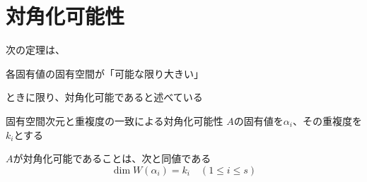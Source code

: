 \documentclass[../../../topic_linear-algebra]{subfiles}
\begin{document}
\sectionline
\section{対角化可能性}

次の定理は、
\begin{shaded}
  各固有値の固有空間が「可能な限り大きい」
\end{shaded}
ときに限り、対角化可能であると述べている

\begin{theorem}{固有空間次元と重複度の一致による対角化可能性}\label{thm:diagonalizable-iff-eigenspace-dim-equals-multiplicity}
  $A$の固有値を$\alpha_i$、その重複度を$k_i$とする

  $A$が対角化可能であることは、次と同値である
  \begin{equation*}
    \dim W(\alpha_i) = k_i \quad (1 \leq i \leq s)
  \end{equation*}
\end{theorem}
\end{document}
